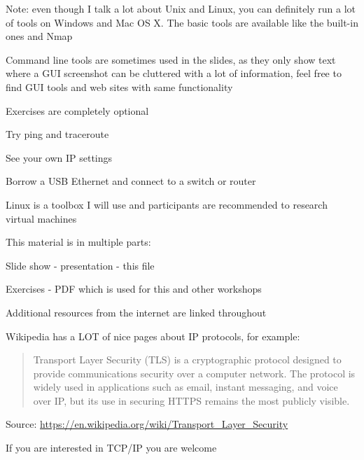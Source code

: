 \documentclass[Screen16to9,17pt]{foils}
\begin{document}
Note: even though I talk a lot about Unix and Linux, you can definitely run a lot of tools on Windows and Mac OS X. The basic tools are available like the built-in ones and Nmap

Command line tools are sometimes used in the slides, as they only show text where a GUI screenshot can be cluttered with a lot of information, feel free to find GUI tools and web sites with same functionality


Exercises are completely optional

\begin{list2}
\item Try ping and traceroute
\item See your own IP settings
\item Borrow a USB Ethernet and connect to a switch or router
\end{list2}

Linux is a toolbox I will use and participants are recommended to research virtual machines




\begin{list2}
\item This material is in multiple parts:

\item Slide show - presentation - this file
\item Exercises - PDF which is used for this and other workshops
\item Additional resources from the internet are linked throughout
\item Wikipedia has a LOT of nice pages about IP protocols, for example:
\end{list2}

\begin{quote}\small
Transport Layer Security (TLS) is a cryptographic protocol designed to provide communications security over a computer network. The protocol is widely used in applications such as email, instant messaging, and voice over IP, but its use in securing HTTPS remains the most publicly visible.
\end{quote}
Source: \url{https://en.wikipedia.org/wiki/Transport_Layer_Security}




If you are interested in TCP/IP you are welcome
\end{document}
